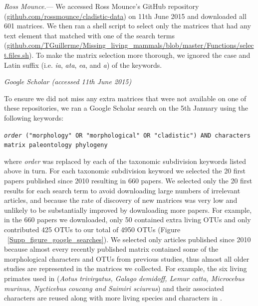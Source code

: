 \documentclass[12pt,letterpaper]{article}
\renewcommand{\subsection}[1]{%
\bigskip
\begin{center}
\begin{large}
\normalfont\itshape #1
\end{large}
\end{center}}
\renewcommand{\subsubsection}[1]{%
\vspace{2ex}
\noindent
\textit{#1.}---}
\begin{document}
\subsubsection{Ross Mounce}
We accessed Ross Mounce's GitHub repository (\url{github.com/rossmounce/cladistic-data}) on 11th June 2015 and downloaded all 601 matrices.
We then ran a shell script to select only the matrices that had any text element that matched with one of the search terms (\url{github.com/TGuillerme/Missing_living_mammals/blob/master/Functions/select.files.sh}).
To make the matrix selection more thorough, we ignored the case and Latin suffix (i.e. \textit{ia}, \textit{ata}, \textit{ea}, and \textit{a}) of the keywords.

\subsection{Google Scholar (accessed 11th June 2015)}
To ensure we did not miss any extra matrices that were not available on one of these repositories, we ran a Google Scholar search on the 5th January %
using the following keywords:

\texttt{\textit{order} ("morphology" OR "morphological" OR "cladistic") AND characters matrix paleontology phylogeny}

where \textit{order} was replaced by each of the taxonomic subdivision keywords listed above in turn.
For each taxonomic subdivision keyword we selected the 20 first papers published since 2010 resulting in 660 papers.
We selected only the 20 first results for each search term to avoid downloading large numbers of irrelevant articles, and because the rate of discovery of new matrices was very low and unlikely to be substantially improved by downloading more papers.
For example, in the 660 papers we downloaded, only 50 contained extra living OTUs and only contributed 425 OTUs to our total of 4950 OTUs (Figure ~\ref{Supp_figure_google_searches}).
We selected only articles published since 2010 because almost every recently published matrix contained some of the morphological characters and OTUs from previous studies, thus almost all older studies are represented in the matrices we collected.
For example, the six living primates used in \cite{ross1998phylogenetic} (\textit{Aotus trivirgatus, Galago demidoff, Lemur catta, Microcebus murinus, Nycticebus coucang and Saimiri sciureus}) and their associated characters are reused along with more living species and characters in \cite{seiffert2003fossil, marivaux2005anthropoid, seiffert2005basal, bloch2007new,bloch2007new, kay2008anatomy, silcox2008biogeographic, seiffert2009convergent,tabuce2009anthropoid, boyer2010astragalar, seiffert2010fossil, marivaux2013djebelemur, ni2013oldest}.
\end{document}
